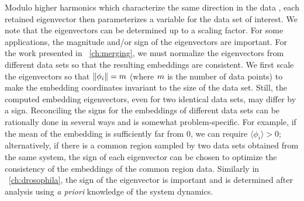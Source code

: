 %




Modulo higher harmonics which characterize the same direction in the data
, each retained eigenvector then parameterizes a variable for the data set of interest.
%
We note that the eigenvectors can be determined up to a scaling factor.
%
For some applications, the magnitude and/or sign of the eigenvectors are important.
%
For the work presented in \chap~\ref{ch:merging}, we must normalize the eigenvectors from different data sets so that the resulting embeddings are consistent.
%
We first scale the eigenvectors so that $\|\phi_i\| = m$ (where $m$ is the number of data points)
to make the embedding coordinates invariant to the size of the data set.
%
Still, the computed embedding eigenvectors, even for two identical data sets, may differ by a sign.
%
Reconciling the signs for the embeddings of different data sets can be rationally done in several ways and is somewhat problem-specific.
%
For example, if the mean of the embedding is sufficiently far from 0, we can require $\langle \phi_i \rangle > 0$;
alternatively, if there is a common region sampled by two data sets obtained from the same system, the sign of each eigenvector can be chosen to optimize the consistency of the embeddings of the common region data.
%
%
Similarly in \chap~\ref{ch:drosophila}, the sign of the eigenvector is important and is determined after analysis using {\em a priori} knowledge of the system dynamics.



